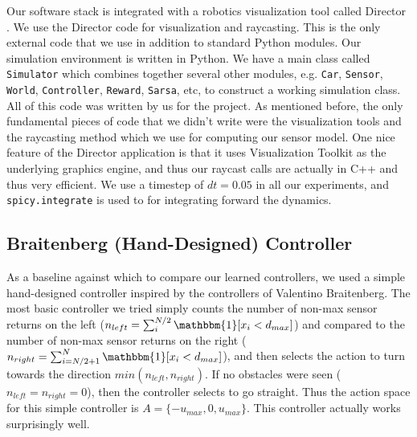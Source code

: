\documentclass{article}
\def\code#1{\texttt{#1}}
\begin{document}
Our software stack is integrated with a robotics visualization tool called Director . We use the Director code for visualization and raycasting. This is the only external code that we use in addition to standard Python modules. Our simulation environment is written in Python. We have a main class called \code{Simulator} which combines together several other modules, e.g. \code{Car}, \code{Sensor}, \code{World}, \code{Controller}, \code{Reward}, \code{Sarsa}, etc, to construct a working simulation class. All of this code was written by us for the project. As mentioned before, the only fundamental pieces of code that we didn't write were the visualization tools and the raycasting method which we use for computing our sensor model. One nice feature of the Director application is that it uses Visualization Toolkit as the underlying graphics engine, and thus our raycast calls are actually in C++ and thus very efficient. We use a timestep of $dt = 0.05$ in all our experiments, and \code{spicy.integrate} is used to for integrating forward the dynamics.

\subsection{Braitenberg (Hand-Designed) Controller}
\label{default_controller}
As a baseline against which to compare our learned controllers, we used a simple hand-designed controller inspired by the controllers of Valentino Braitenberg.  The most basic controller we tried simply counts the number of non-max sensor returns on the left ($n_{left} = \sum_i^{N/2} \mathbbm{1}[x_i < d_{max}]$) and compared to the number of non-max sensor returns on the right ($n_{right} = \sum_{i=N/2+1}^N \mathbbm{1}[x_i < d_{max}]$), and then selects the action to turn towards the direction $min(n_{left}, n_{right})$.  If no obstacles were seen ($n_{left} = n_{right} = 0$), then the controller selects to go straight.  Thus the action space for this simple controller is $A = \{-u_{max}, 0, u_{max} \}$.  This controller actually works surprisingly well.
\end{document}
